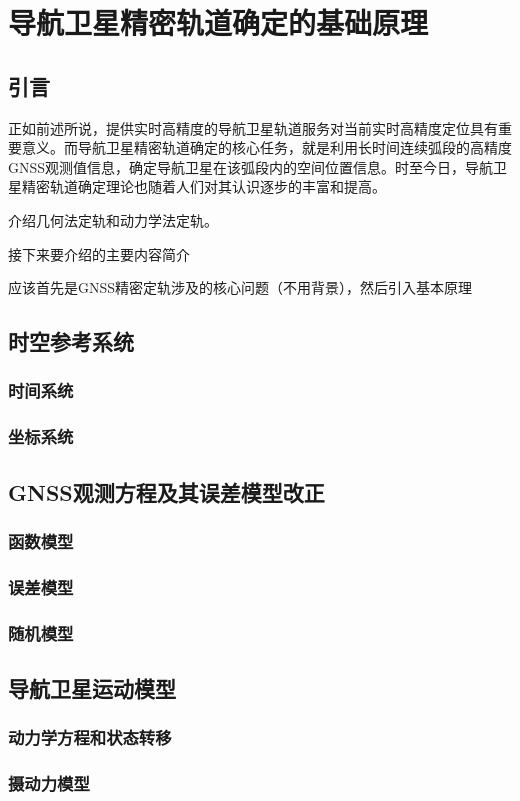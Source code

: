 
\chapter{导航卫星精密轨道确定的基础原理}

\section{引言}

正如前述所说，提供实时高精度的导航卫星轨道服务对当前实时高精度定位具有重要意义。而导航卫星精密轨道确定的核心任务，就是利用长时间连续弧段的高精度GNSS观测值信息，确定导航卫星在该弧段内的空间位置信息。时至今日，导航卫星精密轨道确定理论也随着人们对其认识逐步的丰富和提高。

介绍几何法定轨和动力学法定轨。

接下来要介绍的主要内容简介

应该首先是GNSS精密定轨涉及的核心问题（不用背景），然后引入基本原理

\section{时空参考系统}

\subsection{时间系统}

\subsection{坐标系统}

\section{GNSS观测方程及其误差模型改正}

\subsection{函数模型}

\subsection{误差模型}

\subsection{随机模型}

\section{导航卫星运动模型}

\subsection{动力学方程和状态转移}

\subsection{摄动力模型}
